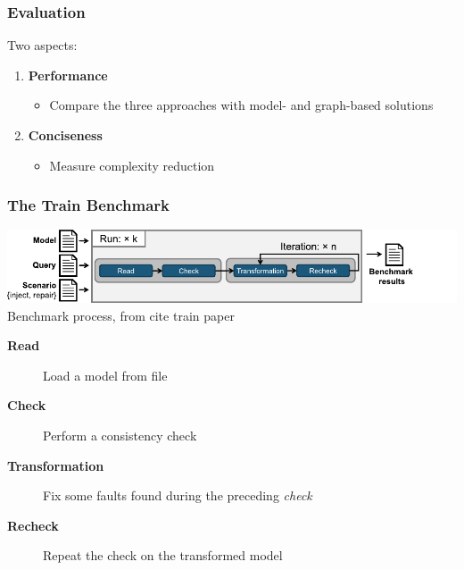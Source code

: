 \documentclass[aspectratio=169,9pt,english]{beamer}
\newenvironment{todolist}{\ttfamily\color{red}TODO\\\begin{itemize}\color{red}\ttfamily}{\end{itemize}}
\newcommand{\todotext}[1]{{\ttfamily\color{red}#1}}
\begin{document}
\begin{frame}
	\frametitle{Evaluation}
	Two aspects:
	\begin{enumerate}
		\item \textbf{Performance}
		\begin{itemize}
			\item Compare the three approaches with model- and graph-based solutions
		\end{itemize}
		\item \textbf{Conciseness}
		\begin{itemize}
			\item Measure complexity reduction
		\end{itemize}	
	\end{enumerate}
	
\end{frame}

\begin{frame}
	\frametitle{The Train Benchmark}
	\includegraphics[width=.9\linewidth]{images/tb_process.pdf}\\
	\footnotesize{Benchmark process, from \todotext{cite train paper}}\normalsize
	
	\vspace{1\baselineskip}
	\begin{description}
		\item[\textbf{Read}] Load a model from file
		\item[\textbf{Check}] Perform a consistency check
		\item[\textbf{Transformation}] Fix some faults found during the preceding \emph{check}
		\item[\textbf{Recheck}] Repeat the check on the transformed model
	\end{description}
\end{frame}
\end{document}
